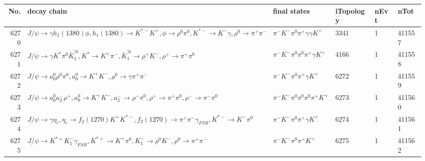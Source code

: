 \begin{table}[htbp] 
\begin{center}
\begin{small}
\begin{tabular}{rlllll}\hline\hline
 No. & decay chain & final states &  iTopology & nEvt & nTot \\\hline
6270&$J/\psi       \rightarrow \gamma       h_{1}(1380)    \phi           , h_{1}(1380)     \rightarrow K^{*-}         K^{+}          , \phi            \rightarrow \rho^{0}      \pi^{0}        , K^{*-}          \rightarrow K^{-}          \gamma       , \rho^{0}       \rightarrow \pi^{+}        \pi^{-}        $&$\pi^{-}        K^{-}          \pi^{0}        \pi^{+}        \gamma       \gamma       K^{+}          $& 3341&    1&411557\\
6271&$J/\psi       \rightarrow \gamma       K^{*}          \pi^{0}        \bar{K}_1^{'0}, K^{*}           \rightarrow K^{+}          \pi^{-}        , \bar{K}_1^{'0} \rightarrow \rho^{+}      K^{-}          , \rho^{+}       \rightarrow \pi^{+}        \pi^{0}        $&$\pi^{-}        K^{-}          \pi^{0}        \pi^{0}        \pi^{+}        \gamma       K^{+}          $& 4166&    1&411558\\
6272&$J/\psi       \rightarrow a_{0}^{0}      \rho^{0}      \pi^{0}        , a_{0}^{0}       \rightarrow K^{+}          K^{-}          , \rho^{0}       \rightarrow \gamma       \pi^{+}        \pi^{-}        $&$\pi^{-}        K^{-}          \pi^{0}        \pi^{+}        \gamma       K^{+}          $& 6272&    1&411559\\
6273&$J/\psi       \rightarrow a_{0}^{0}      a_{2}^{-}      \rho^{+}      , a_{0}^{0}       \rightarrow K^{+}          K^{-}          , a_{2}^{-}       \rightarrow \rho^{-}      \pi^{0}        , \rho^{+}       \rightarrow \pi^{+}        \pi^{0}        , \rho^{-}       \rightarrow \pi^{-}        \pi^{0}        $&$\pi^{-}        K^{-}          \pi^{0}        \pi^{0}        \pi^{0}        \pi^{+}        K^{+}          $& 6273&    1&411560\\
6274&$J/\psi       \rightarrow \gamma       \eta_{c}    , \eta_{c}     \rightarrow f_{2}(1270)    K^{+}          K^{*-}         , f_{2}(1270)     \rightarrow \pi^{+}        \pi^{-}        \gamma_{FSR} , K^{*-}          \rightarrow K^{-}          \pi^{0}        $&$\pi^{-}        K^{-}          \pi^{0}        \pi^{+}        \gamma       K^{+}          $& 6274&    1&411561\\
6275&$J/\psi       \rightarrow K^{*+}         K_{1}^{-}      \gamma_{FSR} , K^{*+}          \rightarrow K^{+}          \pi^{0}        , K_{1}^{-}       \rightarrow \rho^{0}      K^{-}          , \rho^{0}       \rightarrow \pi^{+}        \pi^{-}        $&$\pi^{-}        K^{-}          \pi^{0}        \pi^{+}        K^{+}          $& 6275&    1&411562\\

\end{tabular}
\end{small}
\end{center}
\end{table}
